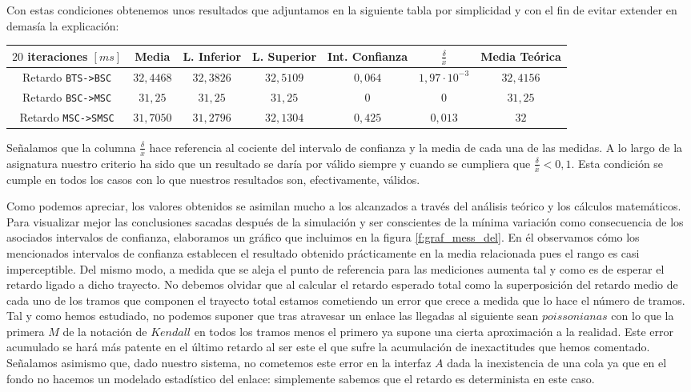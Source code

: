 \documentclass[10pt]{article}
\begin{document}
			Con estas condiciones obtenemos unos resultados que adjuntamos en la siguiente tabla por simplicidad y con el fin de evitar extender en demasía la explicación:

			\begin{center}
				\begin{tabular}{|c|c|c|c|c|c|c|}
					\hline
					$20$ iteraciones $[ms]$ & Media & L. Inferior & L. Superior & Int. Confianza & $\frac{\delta}{\bar{x}}$ & Media Teórica\\
					\hline
					Retardo \texttt{BTS->BSC} & $32,4468$ & $32,3826$ & $32,5109$ & $0,064$ & $1,97 \cdot 10^{-3}$ & $32,4156$\\
					\hline
					Retardo \texttt{BSC->MSC} & $31,25$ & $31,25$ & $31,25$ & $0$ & $0$ & $31,25$\\
					\hline
					Retardo \texttt{MSC->SMSC} & $31,7050$ & $31,2796$ & $32,1304$ & $0,425$ & $0,013$ & $32$\\
					\hline
				\end{tabular}
			\end{center}

			Señalamos que la columna $\frac{\delta}{\bar{x}}$ hace referencia al cociente del intervalo de confianza y la media de cada una de las medidas. A lo largo de la asignatura nuestro criterio ha sido que un resultado se daría por válido siempre y cuando se cumpliera que $\frac{\delta}{\bar{x}} < 0,1$. Esta condición se cumple en todos los casos con lo que nuestros resultados son, efectivamente, válidos.

			Como podemos apreciar, los valores obtenidos se asimilan mucho a los alcanzados a través del análisis teórico y los cálculos matemáticos. Para visualizar mejor las conclusiones sacadas después de la simulación y ser conscientes de la mínima variación como consecuencia de los asociados intervalos de confianza, elaboramos un gráfico que incluimos en la figura \ref{f:graf_mess_del}. En él observamos cómo los mencionados intervalos de confianza establecen el resultado obtenido prácticamente en la media relacionada pues el rango es casi imperceptible. Del mismo modo, a medida que se aleja el punto de referencia para las mediciones aumenta tal y como es de esperar el retardo ligado a dicho trayecto. No debemos olvidar que al calcular el retardo esperado total como la superposición del retardo medio de cada uno de los tramos que componen el trayecto total estamos cometiendo un error que crece a medida que lo hace el número de tramos. Tal y como hemos estudiado, no podemos suponer que tras atravesar un enlace las llegadas al siguiente sean $poissonianas$ con lo que la primera $M$ de la notación de $Kendall$ en todos los tramos menos el primero ya supone una cierta aproximación a la realidad. Este error acumulado se hará más patente en el último retardo al ser este el que sufre la acumulación de inexactitudes que hemos comentado. Señalamos asimismo que, dado nuestro sistema, no cometemos este error en la interfaz $A$ dada la inexistencia de una cola ya que en el fondo no hacemos un modelado estadístico del enlace: simplemente sabemos que el retardo es determinista en este caso.
\end{document}
